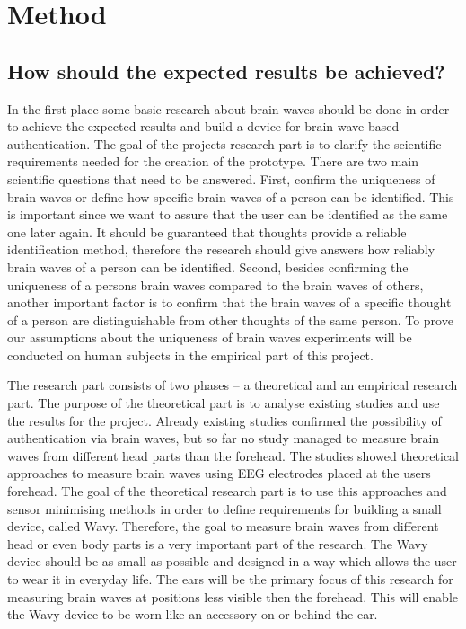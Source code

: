 \section{Method}
\label{sect:method}
\subsection{How should the expected results be achieved?}
In the first place some basic research about brain waves should be done in order to achieve the expected results and build a device for brain wave based authentication. The goal of the projects research part is to clarify the scientific requirements needed for the creation of the prototype. There are two main scientific questions that need to be answered. First, confirm the uniqueness of brain waves or define how specific brain waves of a person can be identified. This is important since we want to assure that the user can be identified as the same one later again. It should be guaranteed that thoughts provide a reliable identification method, therefore the research should give answers how reliably brain waves of a person can be identified. 
Second, besides confirming the uniqueness of a persons brain waves compared to the brain waves of others, another important factor is to confirm that the brain waves of a specific thought of a person are distinguishable from other thoughts of the same person. To prove our assumptions about the uniqueness of brain waves experiments will be conducted on human subjects in the empirical part of this project.  

The research part consists of two phases – a theoretical and an empirical research part. The purpose of the theoretical part is to analyse existing studies and use the results for the project. Already existing studies confirmed the possibility of authentication via brain waves, but so far no study managed to measure brain waves from different head parts than the forehead. The studies showed theoretical approaches to measure brain waves using EEG electrodes placed at the users forehead. The goal of the theoretical research part is to use this approaches and sensor minimising methods in order to define requirements for building a small device, called Wavy. Therefore, the goal to measure brain waves from different head or even body parts is a very important part of the research. The Wavy device should be as small as possible and designed in a way which allows the user to wear it in everyday life. The ears will be the primary focus of this research for measuring brain waves at positions less visible then the forehead. This will enable the Wavy device to be worn like an accessory on or behind the ear. 

